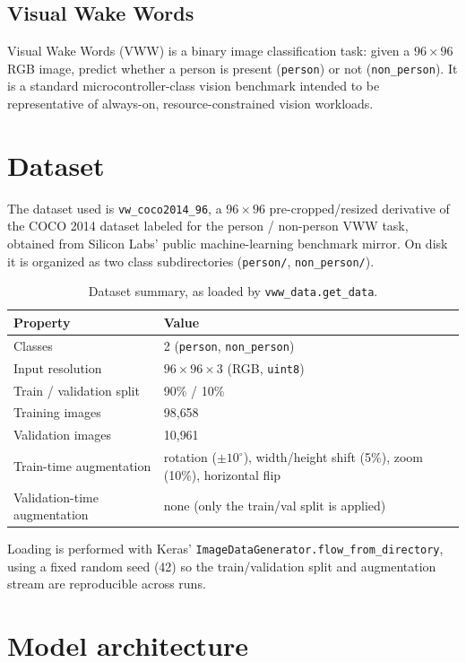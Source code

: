 \documentclass[11pt]{article}
\newcommand{\code}[1]{\texttt{#1}}
\begin{document}
\subsection{Visual Wake Words}

Visual Wake Words (VWW) is a binary image classification task: given a $96\times96$ RGB image, predict whether a person is present (\code{person}) or not (\code{non\_person}). It is a standard microcontroller-class vision benchmark intended to be representative of always-on, resource-constrained vision workloads.

\section{Dataset}

The dataset used is \code{vw\_coco2014\_96}, a $96\times96$ pre-cropped/resized derivative of the COCO 2014 dataset labeled for the person / non-person VWW task, obtained from Silicon Labs' public machine-learning benchmark mirror. On disk it is organized as two class subdirectories (\code{person/}, \code{non\_person/}).

\begin{table}[H]
\centering
\caption{Dataset summary, as loaded by \code{vww\_data.get\_data}.}
\label{tab:dataset}
\begin{tabular}{@{}ll@{}}
\toprule
Property & Value \\
\midrule
Classes & 2 (\code{person}, \code{non\_person}) \\
Input resolution & $96 \times 96 \times 3$ (RGB, \code{uint8}) \\
Train / validation split & 90\% / 10\% \\
Training images & 98{,}658 \\
Validation images & 10{,}961 \\
Train-time augmentation & rotation ($\pm10^{\circ}$), width/height shift (5\%), zoom (10\%), horizontal flip \\
Validation-time augmentation & none (only the train/val split is applied) \\
\bottomrule
\end{tabular}
\end{table}

Loading is performed with Keras' \code{ImageDataGenerator.flow\_from\_directory}, using a fixed random seed (42) so the train/validation split and augmentation stream are reproducible across runs.

\section{Model architecture}
\label{sec:architecture}
\end{document}
